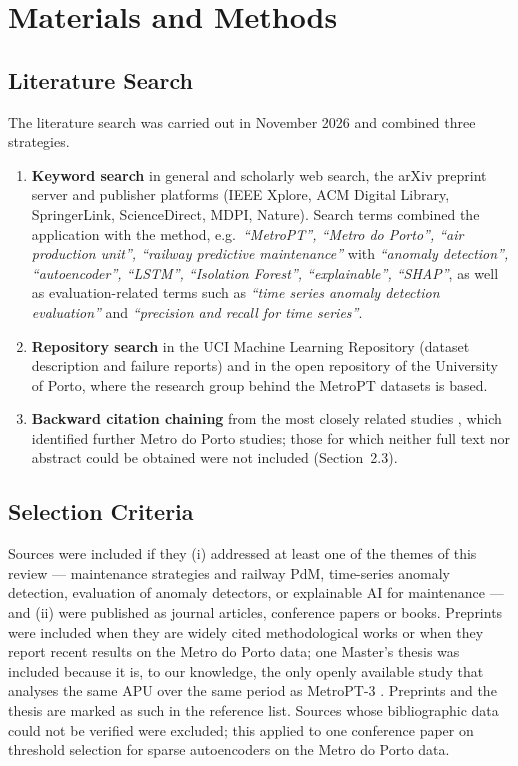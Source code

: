 \documentclass[12pt,a4paper]{article}
\begin{document}
\section{Materials and Methods}
\label{sec:methods}

\subsection{Literature Search}
The literature search was carried out in November 2026 and combined three strategies.
\begin{enumerate}[itemsep=2pt]
  \item \textbf{Keyword search} in general and scholarly web search, the arXiv preprint server and publisher platforms (IEEE Xplore, ACM Digital Library, SpringerLink, ScienceDirect, MDPI, Nature). Search terms combined the application with the method, e.g.\ \textit{``MetroPT'', ``Metro do Porto'', ``air production unit'', ``railway predictive maintenance''} with \textit{``anomaly detection'', ``autoencoder'', ``LSTM'', ``Isolation Forest'', ``explainable'', ``SHAP''}, as well as evaluation-related terms such as \textit{``time series anomaly detection evaluation''} and \textit{``precision and recall for time series''}.
  \item \textbf{Repository search} in the UCI Machine Learning Repository (dataset description and failure reports) and in the open repository of the University of Porto, where the research group behind the MetroPT datasets is based.
  \item \textbf{Backward citation chaining} from the most closely related studies \citep{silva2023adversarial,jakobs2025rules}, which identified further Metro do Porto studies; those for which neither full text nor abstract could be obtained were not included (Section~2.3).
\end{enumerate}

\subsection{Selection Criteria}
Sources were included if they (i) addressed at least one of the themes of this review --- maintenance strategies and railway PdM, time-series anomaly detection, evaluation of anomaly detectors, or explainable AI for maintenance --- and (ii) were published as journal articles, conference papers or books. Preprints were included when they are widely cited methodological works or when they report recent results on the Metro do Porto data; one Master's thesis was included because it is, to our knowledge, the only openly available study that analyses the same APU over the same period as MetroPT-3 \citep{barros2020thesis}. Preprints and the thesis are marked as such in the reference list. Sources whose bibliographic data could not be verified were excluded; this applied to one conference paper on threshold selection for sparse autoencoders on the Metro do Porto data.
\end{document}
